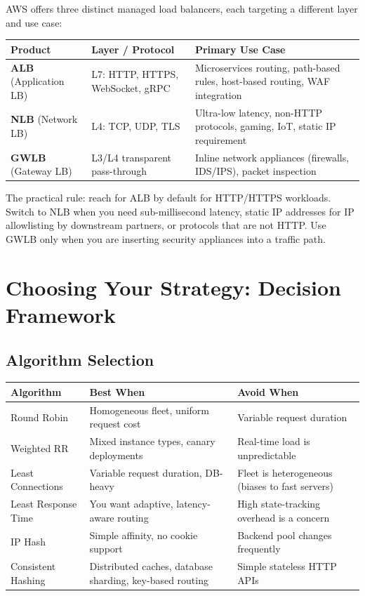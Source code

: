 \documentclass[11pt,a4paper]{article}
\begin{document}
AWS offers three distinct managed load balancers, each targeting a different layer and use case:

\medskip
\begin{tabularx}{\linewidth}{@{}lXX@{}}
  \toprule
  \textbf{Product} & \textbf{Layer / Protocol} & \textbf{Primary Use Case} \\
  \midrule
  \textbf{ALB} (Application LB) & L7: HTTP, HTTPS, WebSocket, gRPC &
    Microservices routing, path-based rules, host-based routing, WAF integration \\
  \addlinespace
  \textbf{NLB} (Network LB) & L4: TCP, UDP, TLS &
    Ultra-low latency, non-HTTP protocols, gaming, IoT, static IP requirement \\
  \addlinespace
  \textbf{GWLB} (Gateway LB) & L3/L4 transparent pass-through &
    Inline network appliances (firewalls, IDS/IPS), packet inspection \\
  \bottomrule
\end{tabularx}
\medskip

The practical rule: reach for ALB by default for HTTP/HTTPS workloads. Switch to NLB when you need
sub-millisecond latency, static IP addresses for IP allowlisting by downstream partners, or
protocols that are not HTTP. Use GWLB only when you are inserting security appliances into a traffic
path.

\section{Choosing Your Strategy: Decision Framework}

\subsection{Algorithm Selection}

\medskip
\begin{tabularx}{\linewidth}{@{}lXX@{}}
  \toprule
  \textbf{Algorithm} & \textbf{Best When} & \textbf{Avoid When} \\
  \midrule
  Round Robin & Homogeneous fleet, uniform request cost & Variable request duration \\
  \addlinespace
  Weighted RR & Mixed instance types, canary deployments & Real-time load is unpredictable \\
  \addlinespace
  Least Connections & Variable request duration, DB-heavy & Fleet is heterogeneous (biases to fast servers) \\
  \addlinespace
  Least Response Time & You want adaptive, latency-aware routing & High state-tracking overhead is a concern \\
  \addlinespace
  IP Hash & Simple affinity, no cookie support & Backend pool changes frequently \\
  \addlinespace
  Consistent Hashing & Distributed caches, database sharding, key-based routing & Simple stateless HTTP APIs \\
  \bottomrule
\end{tabularx}
\medskip
\end{document}
